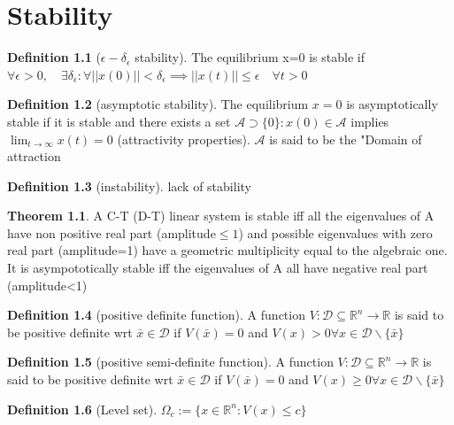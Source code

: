\documentclass{book}
\newcommand{\R}{\mathbb{R}}
\theoremstyle{definition}
\newtheorem{definition}{Definition}[section]
\newtheorem{theorem}{Theorem}[section]
\theoremstyle{remark}
\theoremstyle{remark}
\begin{document}
\chapter{Stability}
\begin{definition}[$\epsilon-\delta_{\epsilon}$ stability]
    The equilibrium x=0 is stable if $\forall \epsilon>0, \quad \exists \delta_{\epsilon}:\forall ||x(0)||<\delta_{\epsilon}\implies ||x(t)||\leq \epsilon \quad \forall t>0$
\end{definition}
\begin{definition}[asymptotic stability]
    The equilibrium $x=0$ is asymptotically stable if it is stable and there exists a set $\mathcal{A} \supset \{0\}:x(0) \in \mathcal{A}$ implies $\lim_{t \to \infty}x(t)=0$ (attractivity properties). $\mathcal{A}$ is said to be the "Domain of attraction
\end{definition}
\begin{definition}[instability]
    lack of stability
\end{definition}
\begin{theorem}
    A C-T (D-T) linear system is stable iff all the eigenvalues of A have non positive real part (amplitude$\leq 1$) and possible eigenvalues with zero real part (amplitude=1) have a geometric multiplicity equal to the algebraic one. It is asympototically stable iff the eigenvalues of A all have negative real part (amplitude<1)
\end{theorem}
\begin{definition}[positive definite function]
    A function $V:\mathcal{D}\subseteq \R^n \to \R$ is said to be positive definite wrt $\bar{x} \in \mathcal{D}$ if $V(\bar{x})=0$ and $V(x)>0 \forall x \in \mathcal{D} \backslash \{\bar{x}\}$
\end{definition}
\begin{definition}[positive semi-definite function]
    A function $V:\mathcal{D}\subseteq \R^n \to \R$ is said to be positive definite wrt $\bar{x} \in \mathcal{D}$ if $V(\bar{x})=0$ and $V(x)\geq 0 \forall x \in \mathcal{D} \backslash \{\bar{x}\}$
\end{definition}
\begin{definition}[Level set]
    $\Omega_c := \{x\in \R^n : V(x)\leq c\}$
\end{definition}
\end{document}
